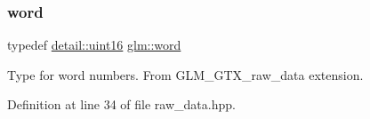 \subsubsection{\texorpdfstring{word}{word}}
{\footnotesize\ttfamily typedef \mbox{\hyperlink{namespaceglm_1_1detail_a47b2a7d006d187338e8031a352d1ce56}{detail\+::uint16}} \mbox{\hyperlink{group__gtx__raw__data_ga5617a479d471021b5c773c5e969ba46d}{glm\+::word}}}

Type for word numbers. From G\+L\+M\+\_\+\+G\+T\+X\+\_\+raw\+\_\+data extension. 

Definition at line 34 of file raw\+\_\+data.\+hpp.

